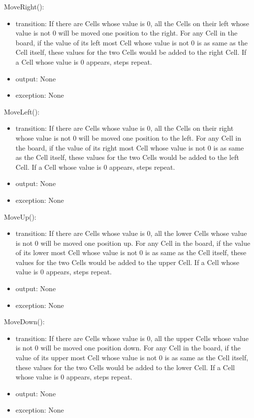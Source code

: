 \documentclass[12pt]{article}
\begin{document}
\noindent MoveRight():
\begin{itemize}
\item transition: If there are Cells whose value is 0, all the Cells on their left whose value is not 0 will be moved one position to the right. For any Cell in the board, 
if the value of its left most Cell whose value is not 0 is as same as the Cell itself, these values for the two Cells would be added to the right Cell. If a Cell whose value is 0 appears, steps repeat.
\item output: None
\item exception: None
\end{itemize}

\noindent MoveLeft():
\begin{itemize}
\item transition: If there are Cells whose value is 0, all the Cells on their right whose value is not 0 will be moved one position to the left. For any Cell in the board, 
if the value of its right most Cell whose value is not 0 is as same as the Cell itself, these values for the two Cells would be added to the left Cell. If a Cell whose value is 0 appears, steps repeat.
\item output: None
\item exception: None
\end{itemize}

\noindent MoveUp():
\begin{itemize}
\item transition: If there are Cells whose value is 0, all the lower Cells whose value is not 0 will be moved one position up. For any Cell in the board, 
if the value of its lower most Cell whose value is not 0 is as same as the Cell itself, these values for the two Cells would be added to the upper Cell. If a Cell whose value is 0 appears, steps repeat.
\item output: None
\item exception: None
\end{itemize}

\noindent MoveDown():
\begin{itemize}
\item transition: If there are Cells whose value is 0, all the upper Cells whose value is not 0 will be moved one position down. For any Cell in the board, 
if the value of its upper most Cell whose value is not 0 is as same as the Cell itself, these values for the two Cells would be added to the lower Cell. If a Cell whose value is 0 appears, steps repeat.
\item output: None
\item exception: None
\end{itemize}
\end{document}
